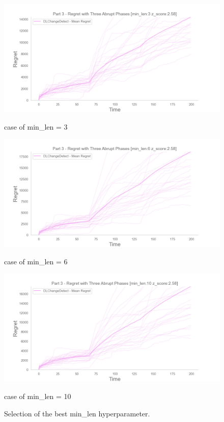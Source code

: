 \begin{figure}[!htb]
	\centering

  		\includegraphics[width=\linewidth]{images/part3_min-len3_z_score2_58.png}
  		\caption{case of min\_len = 3}\label{minlen3}  		
	\endminipage\hfill
  		\includegraphics[width=\linewidth]{images/part3_min-len6_z_score2_58.png}
  		\caption{case of min\_len = 6}\label{minlen6}  
	\endminipage\hfill
  		\includegraphics[width=\linewidth]{images/part3_min-len10_z_score2_58.png}
  		\caption{case of min\_len = 10}\label{minlen10}  
	\endminipage\hfill
	
	\caption{Selection of the best min\_len hyperparameter.}
	\label{minLenValidationFig}
\end{figure}



